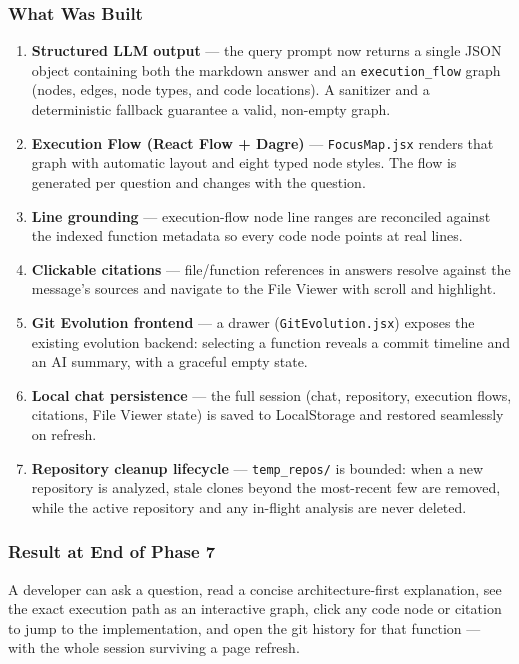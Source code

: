 \documentclass[a4paper,11pt]{article}
\begin{document}
\subsubsection{What Was Built}
\begin{enumerate}
    \item \textbf{Structured LLM output} --- the query prompt now returns a single JSON object containing both the markdown answer and an \texttt{execution\_flow} graph (nodes, edges, node types, and code locations). A sanitizer and a deterministic fallback guarantee a valid, non-empty graph.
    \item \textbf{Execution Flow (React Flow + Dagre)} --- \texttt{FocusMap.jsx} renders that graph with automatic layout and eight typed node styles. The flow is generated per question and changes with the question.
    \item \textbf{Line grounding} --- execution-flow node line ranges are reconciled against the indexed function metadata so every code node points at real lines.
    \item \textbf{Clickable citations} --- file/function references in answers resolve against the message's sources and navigate to the File Viewer with scroll and highlight.
    \item \textbf{Git Evolution frontend} --- a drawer (\texttt{GitEvolution.jsx}) exposes the existing evolution backend: selecting a function reveals a commit timeline and an AI summary, with a graceful empty state.
    \item \textbf{Local chat persistence} --- the full session (chat, repository, execution flows, citations, File Viewer state) is saved to LocalStorage and restored seamlessly on refresh.
    \item \textbf{Repository cleanup lifecycle} --- \texttt{temp\_repos/} is bounded: when a new repository is analyzed, stale clones beyond the most-recent few are removed, while the active repository and any in-flight analysis are never deleted.
\end{enumerate}

\subsubsection{Result at End of Phase 7}
A developer can ask a question, read a concise architecture-first explanation, see the exact execution path as an interactive graph, click any code node or citation to jump to the implementation, and open the git history for that function --- with the whole session surviving a page refresh.
\end{document}

